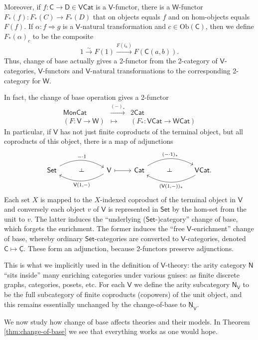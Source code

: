\documentclass{amsart}
\theoremstyle{definition}
\def\ld{\rotatebox[origin=c]{-90}{$\dashv$}} %
\newcommand{\Set}{\mathsf{Set}}
\newcommand{\Cat}{\mathsf{Cat}}
\newcommand{\Mon}{\mathsf{Mon}}
\newcommand{\NN}{\mathsf{N}}
\newcommand{\V}{\mathsf{V}}
\newcommand{\W}{\mathsf{W}}
\newcommand{\D}{\mathsf{D}}
\newcommand{\C}{\mathsf{C}}
\newcommand{\Obj}{\mathrm{Ob}}
\newcommand{\maps}{\colon}
\begin{document}
Moreover, if $f\maps \C \to \D \in \V\Cat$ is a $\V$-functor, there is a $\W$-functor $F_*(f) \maps F_*(C) \to F_*(D)$ that on objects equals $f$ and on hom-objects equals $F(f)$. If $\alpha\maps f \Rightarrow g$ is a $\V$-natural transformation and $c\in \Obj(\C)$, then we define $F_*(\alpha)_c$ to be the composite
\[      1 \stackrel{\sim}{\longrightarrow} F(1) \stackrel{F(i_a)}{\longrightarrow}
F(\C(a,b)) .\]   
Thus, change of base actually gives a 2-functor from the 2-category of $\V$-categories, 
$\V$-functors and $\V$-natural transformations to the corresponding 2-category for $\W$.

In fact, the change of base operation gives a 2-functor
\[\begin{array}{ccc}
\Mon\Cat & \xrightarrow{(-)_*} & 2\Cat\\
(F\maps \V\to\W) & \mapsto & (F_*\maps \V\Cat\to\W\Cat)
\end{array}\]
In particular, if $\V$ has not just finite coproducts of the terminal object, but all 
coproducts of this object, there is a map of adjunctions
\[\begin{tikzcd}
	\Set \arrow[bend left,below]{rr}{-\cdot 1}
	& \ld &
	\arrow[bend left,above]{ll}{\V(1,-)} \V
	\arrow[maps to]{r}
	& \Cat \arrow[bend left,below]{rr}{(-\cdot 1)_*}
	& \ld &
	\arrow[bend left,above]{ll}{(\V(1,-))_*} \V\Cat.
\end{tikzcd}\]
Each set $X$ is mapped to the $X$-indexed coproduct of the terminal object in $\V$ and conversely each object $v$ of $\V$ is represented in $\Set$ by the hom-set from the unit to $v$. The latter induces the ``underlying ($\Set$-)category'' change of base, which forgets the enrichment. The former induces the ``free $\V$-enrichment'' change of base, whereby ordinary $\Set$-categories are converted to $\V$-categories, denoted $\C \mapsto \underline{\C}$. These form an adjunction, because 2-functors preserve adjunctions.

This is what we implicitly used in the definition of $\V$-theory: the arity category $\NN$ ``sits inside'' many enriching categories under various guises: as finite discrete graphs, categories, posets, etc. For each $\V$ we define the arity subcategory $\NN_\V$ to be the full subcategory of finite coproducts (copowers) of the unit object, and this remains essentially unchanged by the change-of-base to $\underline{\NN}_\V$.

We now study how change of base affects theories and their models.  In Theorem \ref{thm:change-of-base} we see that everything works as one would hope.
\end{document}
